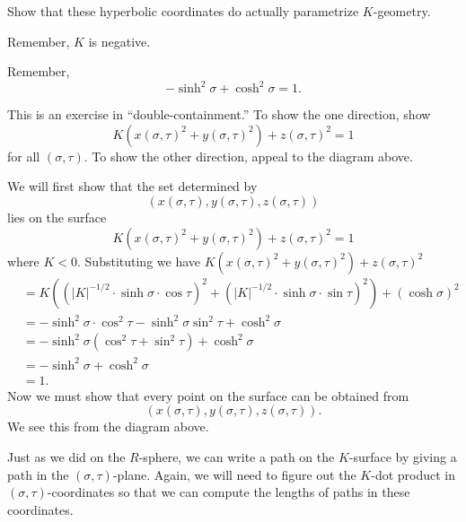 \documentclass[newpage,hints,handout]{ximera}
\begin{document}
\begin{problem}
Show that these hyperbolic coordinates do actually parametrize $K$-geometry.
\begin{hint}
  Remember, $K$ is negative.
\end{hint}
\begin{hint}
  Remember,
  \[
  -\sinh^2\sigma + \cosh^2\sigma =1.
  \]
\end{hint}
\begin{hint}
  This is an exercise in ``double-containment.'' To show the one
  direction, show
\[
K\left(x(\sigma,\tau)^{2}+y(\sigma,\tau)^{2}\right)+z(\sigma,\tau)^{2}=1
\]
for all $(\sigma,\tau)$. To show the other direction, appeal to the
diagram above.
\end{hint}
\begin{freeResponse}
  We will first show that the set determined by
  \[
  \left(x(\sigma,\tau), y(\sigma,\tau), z(\sigma,\tau)\right)
  \]
  lies on the surface
  \[
  K\left(x(\sigma,\tau) ^{2}+y(\sigma,\tau) ^{2}\right) +z(\sigma,\tau)^{2} = 1
  \]
  where $K<0$. Substituting we have
  $K\left(x(\sigma,\tau) ^{2}+y(\sigma,\tau) ^{2}\right)
  +z(\sigma,\tau)^{2}$
  \begin{align*}
    &=K\left((|K|^{-1/2}\cdot\sinh\sigma\cdot\cos\tau)^{2}+(|K|^{-1/2}\cdot\sinh\sigma\cdot\sin\tau)^{2}\right) +(\cosh\sigma)^{2} \\
    &= -\sinh^2\sigma\cdot\cos^2\tau-\sinh^2\sigma\sin^2\tau + \cosh^2\sigma \\
    &= -\sinh^2\sigma(\cos^2\tau+\sin^2\tau) + \cosh^2\sigma \\
    &= -\sinh^2\sigma + \cosh^2\sigma \\
    &=1.
  \end{align*}
  Now we must show that every point on the surface can be obtained from
  \[
  \left(x(\sigma,\tau), y(\sigma,\tau), z(\sigma,\tau)\right).
  \]
  We see this from the diagram above. 
\end{freeResponse}
\end{problem}

Just as we did on the $R$-sphere, we can write a path on the
$K$-surface by giving a path in the $(\sigma,\tau)$-plane. Again, we
will need to figure out the $K$-dot product in
$(\sigma,\tau)$-coordinates so that we can compute the lengths of
paths in these coordinates.
\end{document}
